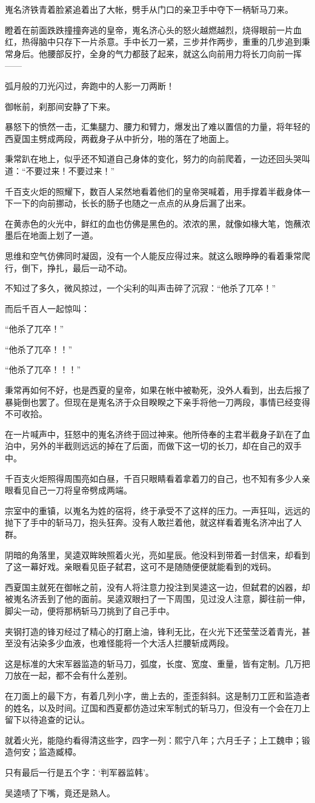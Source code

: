 嵬名济铁青着脸紧追着出了大帐，劈手从门口的亲卫手中夺下一柄斩马刀来。

瞪着在前面跌跌撞撞奔逃的皇帝，嵬名济心头的怒火越燃越烈，烧得眼前一片血红，热得脑中只存下一片杀意。手中长刀一紧，三步并作两步，重重的几步追到秉常身后。他腰部反拧，全身的气力都鼓了起来，就这么向前用力将长刀向前一挥——

弧月般的刀光闪过，奔跑中的人影一刀两断！

御帐前，刹那间安静了下来。

暴怒下的愤然一击，汇集腿力、腰力和臂力，爆发出了难以置信的力量，将年轻的西夏国主劈成两段，两截身子从中折分，啪的落在了地面上。

秉常趴在地上，似乎还不知道自己身体的变化，努力的向前爬着，一边还回头哭叫道：“不要过来！不要过来！”

千百支火炬的照耀下，数百人呆然地看着他们的皇帝哭喊着，用手撑着半截身体一下一下的向前挪动，长长的肠子也随之一点点的从身后漏了出来。

在黄赤色的火光中，鲜红的血也仿佛是黑色的。浓浓的黑，就像如椽大笔，饱蘸浓墨后在地面上划了一道。

思维和空气仿佛同时凝固，没有一个人能反应得过来。就这么眼睁睁的看着秉常爬行，倒下，挣扎，最后一动不动。

不知过了多久，微风掠过，一个尖利的叫声击碎了沉寂：“他杀了兀卒！”

而后千百人一起惊叫：

“他杀了兀卒！”

“他杀了兀卒！！”

“他杀了兀卒！！！”

秉常再如何不好，也是西夏的皇帝，如果在帐中被勒死，没外人看到，出去后报了暴毙倒也罢了。但现在是嵬名济于众目睽睽之下亲手将他一刀两段，事情已经变得不可收拾。

在一片喊声中，狂怒中的嵬名济终于回过神来。他所侍奉的主君半截身子趴在了血泊中，另外的半截则远远的掉在了后面，而做下这一切的长刀，却在自己的双手中。

千百支火炬照得周围亮如白昼，千百只眼睛看着拿着刀的自己，也不知有多少人亲眼看见自己一刀将皇帝劈成两端。

宗室中的重镇，以嵬名为姓的宿将，终于承受不了这样的压力。一声狂叫，远远的抛下了手中的斩马刀，抱头狂奔。没有人敢拦着他，就这样看着嵬名济冲出了人群。

阴暗的角落里，吴逵双眸映照着火光，亮如星辰。他没料到带着一封信来，却看到了这一幕好戏。亲眼看见臣子弑君，这可不是随随便便就能看到的戏码。

西夏国主就死在御帐之前，没有人将注意力投注到吴逵这一边，但弑君的凶器，却被嵬名济丢到了他的面前。吴逵双眼扫了一下周围，见过没人注意，脚往前一伸，脚尖一动，便将那柄斩马刀挑到了自己手中。

夹钢打造的锋刃经过了精心的打磨上油，锋利无比，在火光下还莹莹泛着青光，甚至没有沾染多少血液，也难怪能将一个大活人拦腰斩成两段。

这是标准的大宋军器监造的斩马刀，弧度，长度、宽度、重量，皆有定制。几万把刀放在一起，都不会有什么差别。

在刀面上的最下方，有着几列小字，凿上去的，歪歪斜斜。这是制刀工匠和监造者的姓名，以及时间。辽国和西夏都仿造过宋军制式的斩马刀，但没有一个会在刀上留下以待追查的记认。

就着火光，能隐约看得清这些字，四字一列：熙宁八年；六月壬子；上工魏申；锻造何安；监造臧樟。

只有最后一行是五个字：‘判军器监韩’。

吴逵啧了下嘴，竟还是熟人。

